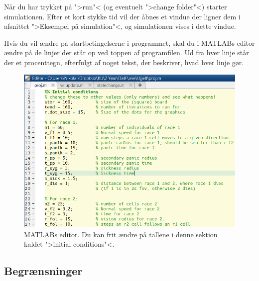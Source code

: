 \documentclass[a4paper,10pt]{article} 	%
\numberwithin{equation}{section}
\begin{document}
	Når du har trykket på ">run"< (og eventuelt ">change folder"<) starter simulationen. Efter et kort stykke tid vil der åbnes et vindue der ligner dem i afsnittet ">Eksempel på simulation"<, og simulationen vises i dette vindue.
	
	Hvis du vil ændre på startbetingelserne i programmet, skal du i MATLABs editor ændre på de linjer der står op ved toppen af programfilen. Ud fra hver linje står der et procenttegn, efterfulgt af noget tekst, der beskriver, hvad hver linje gør.
	
	\begin{figure}[H]
		\centering
		\includegraphics[width=12cm]{img/editor.png}
		\caption{MATLABs editor. Du kan frit ændre på tallene i denne sektion kaldet ">initial conditions"<.}
		\label{fig_editor}
	\end{figure}
	
	\subsection{Begrænsninger}
	
	
	
\end{document}
